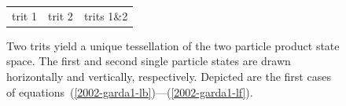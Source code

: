 \documentclass{article}
\begin{document}
\begin{figure}
\begin{center}
\begin{tabular}{ccc}
trit 1&trit 2& trits 1\&2
\end{tabular}
\end{center}
\caption{Two trits yield a unique tessellation of the two particle product state space.
The first and second single particle states are drawn horizontally and
vertically, respectively.
Depicted are the first cases of equations~(\ref{2002-garda1-lb})---(\ref{2002-garda1-lf}).\label{2002-garda1-f1}}
\end{figure}

\end{document}
